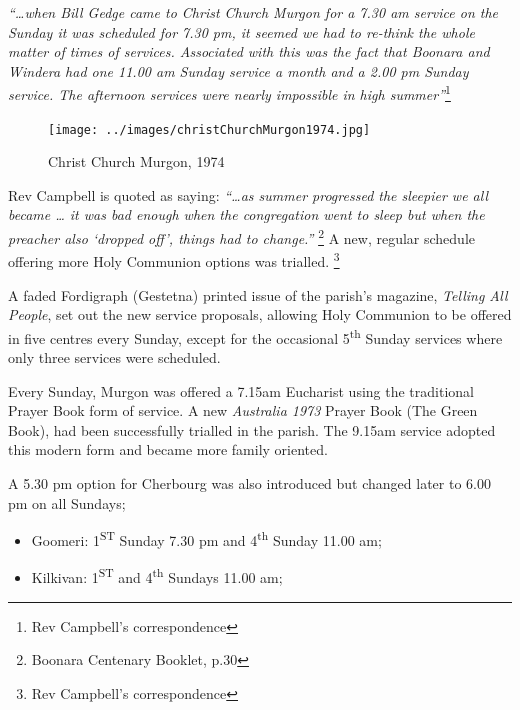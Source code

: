 \emph{``\ldots when Bill Gedge came to Christ Church Murgon for a 7.30 am service on the Sunday it was scheduled for 7.30 pm, it seemed we had to re-think the whole matter of times of services. Associated with this was the fact that Boonara and Windera had one 11.00 am Sunday service a month and a 2.00 pm Sunday service. The afternoon services were nearly impossible in high summer''}\footnote{Rev Campbell's correspondence}








\begin{figure}
\begin{center}
\texttt{[image: ../images/christChurchMurgon1974.jpg]}
\caption{Christ Church Murgon, 1974}
\end{center}
\end{figure}




Rev Campbell is quoted as saying: \emph{``\ldots as summer progressed the sleepier we all became \ldots{} it was bad enough when the congregation went to sleep but when the preacher also `dropped off', things had to change.''} \footnote{Boonara Centenary Booklet, p.30} A new, regular schedule offering more Holy Communion options was trialled. \footnote{Rev Campbell's correspondence}


A faded Fordigraph (Gestetna) printed issue of the parish's magazine, \emph{Telling All People}, set out the new service proposals, allowing Holy Communion to be offered in five centres every Sunday, except for the occasional 5\textsuperscript{th} Sunday services where only three services were scheduled.



Every Sunday, Murgon was offered a 7.15am Eucharist using the traditional Prayer Book form of service. A new \emph{Australia 1973} Prayer Book (The Green Book), had been successfully trialled in the parish. The 9.15am service adopted this modern form and became more family oriented.



A 5.30 pm option for Cherbourg was also introduced but changed later to 6.00 pm on all Sundays;



\begin{itemize}

\item

  Goomeri: 1\textsuperscript{ST} Sunday 7.30 pm and 4\textsuperscript{th} Sunday 11.00 am;

\item

  Kilkivan: 1\textsuperscript{ST} and 4\textsuperscript{th} Sundays 11.00 am;

\end{itemize}



